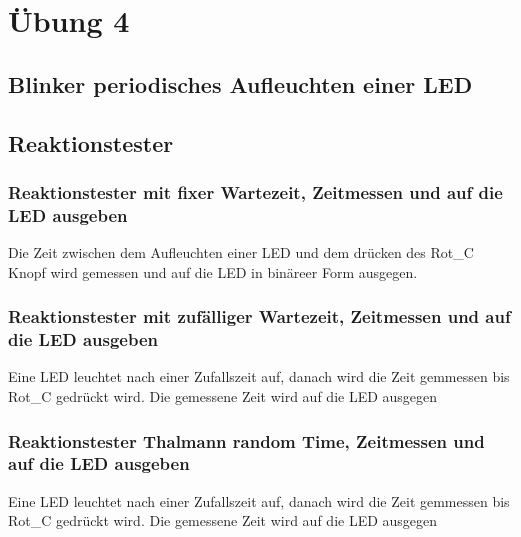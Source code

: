 \section{Übung 4}
\subsection{Blinker periodisches Aufleuchten einer LED}

\subsection{Reaktionstester}
\subsubsection{Reaktionstester mit fixer Wartezeit, Zeitmessen und auf die LED ausgeben}
Die Zeit zwischen dem Aufleuchten einer LED und dem drücken des Rot\_C Knopf wird gemessen und auf die LED in binäreer Form ausgegen.

\subsubsection{Reaktionstester mit zufälliger Wartezeit, Zeitmessen und auf die LED ausgeben}
Eine LED leuchtet nach einer Zufallszeit auf, danach wird die Zeit gemmessen bis Rot\_C gedrückt wird. Die gemessene Zeit wird auf die LED ausgegen

\subsubsection{Reaktionstester Thalmann random Time, Zeitmessen und auf die LED ausgeben}
Eine LED leuchtet nach einer Zufallszeit auf, danach wird die Zeit gemmessen bis Rot\_C gedrückt wird. Die gemessene Zeit wird auf die LED ausgegen


